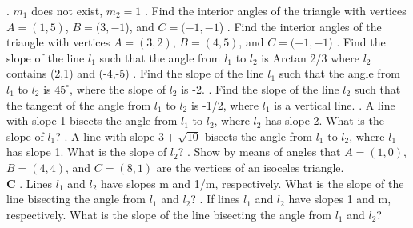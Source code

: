 \documentclass[10pt,letterpaper]{article}
\begin{document}
. $m_1$ does not exist, $m_2=1$
. Find the interior angles of the triangle with vertices $A=(1,5)$, $B=(3,-1$), and $C=(-1,-1$)
. Find the interior angles of the triangle with vertices $A=(3,2)$, $B=(4,5)$, and $C=(-1,-1$)
. Find the slope of the line $l_1$ such that the angle from $l_1$ to $l_2$ is Arctan 2/3 where $l_2$ contains (2,1) and (-4,-5)
. Find the slope of the line $l_1$ such that the angle from $l_1$ to $l_2$ is $45^{\circ}$, where the slope of $l_2$ is -2.
. Find the slope of the line $l_2$ such that the tangent of the angle from $l_1$ to $l_2$ is -1/2, where $l_1$ is a vertical line.
. A line with slope 1 bisects the angle from $l_1$ to $l_2$, where $l_2$ has slope 2. What is the slope of $l_1$?
. A line with slope $3 + \sqrt{10}$ bisects the angle from $l_1$ to $l_2$, where $l_1$ has slope 1. What is the slope of $l_2$?
. Show by means of angles that $A=(1,0)$, $B=(4,4)$, and $C=(8,1)$ are the vertices of an isoceles triangle.
\\
\newline \textbf{C}
. Lines $l_1$ and $l_2$ have slopes m and 1/m, respectively. What is the slope of the line bisecting the angle from $l_1$ and $l_2$?
. If lines $l_1$ and $l_2$ have slopes 1 and m, respectively. What is the slope of the line bisecting the angle from $l_1$ and $l_2$?
\newline \textit{}
\end{document}
